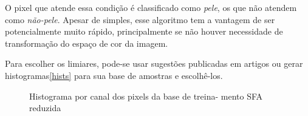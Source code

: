 \documentclass[conference]{IEEEtran}
\begin{document}
O pixel que atende essa condição é classificado como \textit{pele}, os que não atendem como \textit{não-pele}. Apesar de simples, esse algoritmo tem a vantagem de ser potencialmente muito rápido, principalmente se não houver necessidade de transformação do espaço de cor da imagem.

Para escolher os limiares, pode-se usar sugestões publicadas em artigos ou gerar histogramas\ref{hists} para sua base de amostras e escolhê-los.

\begin{figure}
\label{hists}
\centering
{}\hfil
{}\hfil 
{} 

\hfil   
{}\hfil
{}
\caption{Histograma por canal dos pixels da base de treina- mento SFA reduzida}\label{figure}
\end{figure}
\end{document}
